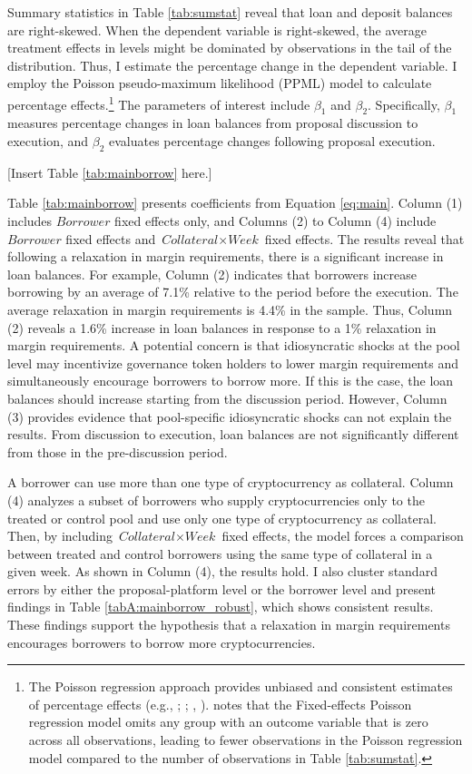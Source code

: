 \documentclass[12pt]{article}
\begin{document}
 Summary statistics in Table \ref{tab:sumstat} reveal that loan and deposit balances are right-skewed. When the dependent variable is right-skewed, the average treatment effects in levels might be dominated by observations in the tail of the distribution. Thus, I estimate the percentage change in the dependent variable. I employ the Poisson pseudo-maximum likelihood (PPML) model to calculate percentage effects.\footnote{ The Poisson regression approach provides unbiased and consistent estimates of percentage effects (e.g., \citealp{gourieroux1984pseudo}; \citealp{silva2006log}; \citealp{cohn2022count}, \citealp{chen2023logs}). \cite{cohn2022count} notes that the Fixed-effects Poisson regression model omits any group with an outcome variable that is zero across all observations, leading to fewer observations in the Poisson regression model compared to the number of observations in Table \ref{tab:sumstat}.} The parameters of interest include $\beta_1$ and $\beta_2$. Specifically, $\beta_1$ measures percentage changes in loan balances from proposal discussion to execution, and $\beta_2$ evaluates percentage changes following proposal execution. 


\centerline{[Insert Table \ref{tab:mainborrow} here.]}

Table \ref{tab:mainborrow} presents coefficients from Equation \ref{eq:main}. Column (1) includes $\textit{Borrower}$ fixed effects only, and Columns (2) to Column (4) include $\textit{Borrower}$ fixed effects and $\textit{Collateral}\times\textit{Week}$ fixed effects. The results reveal that following a relaxation in margin requirements, there is a significant increase in loan balances. For example, Column (2) indicates that borrowers increase borrowing by an average of 7.1\% relative to the period before the execution. The average relaxation in margin requirements is 4.4\% in the sample. Thus, Column (2) reveals a 1.6\% increase in loan balances in response to a 1\% relaxation in margin requirements. A potential concern is that idiosyncratic shocks at the pool level may incentivize governance token holders to lower margin requirements and simultaneously encourage borrowers to borrow more. If this is the case, the loan balances should increase starting from the discussion period. However, Column (3) provides evidence that pool-specific idiosyncratic shocks can not explain the results. From discussion to execution, loan balances are not significantly different from those in the pre-discussion period. 

A borrower can use more than one type of cryptocurrency as collateral. Column (4) analyzes a subset of borrowers who supply cryptocurrencies only to the treated or control pool and use only one type of cryptocurrency as collateral. Then, by including $\textit{Collateral}\times\textit{Week}$ fixed effects, the model forces a comparison between treated and control borrowers using the same type of collateral in a given week. As shown in Column (4), the results hold. I also cluster standard errors by either the proposal-platform level or the borrower level and present findings in Table \ref{tabA:mainborrow_robust}, which shows consistent results. These findings support the hypothesis that a relaxation in margin requirements encourages borrowers to borrow more cryptocurrencies.
\end{document}
